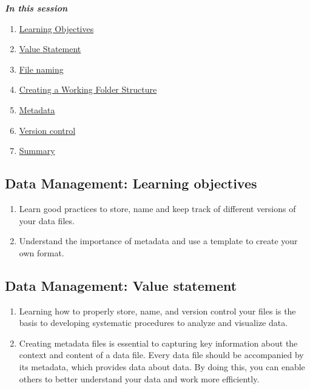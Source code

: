 \documentclass[
]{book}
\providecommand{\tightlist}{%
  \setlength{\itemsep}{0pt}\setlength{\parskip}{0pt}}
\begin{document}
\textbf{\emph{In this session}}

\begin{enumerate}
\def\labelenumi{\arabic{enumi}.}
\tightlist
\item
  \protect\hyperlink{data-management-learning-objectives}{Learning Objectives}
\item
  \protect\hyperlink{data-management-value-statement}{Value Statement}
\item
  \protect\hyperlink{file-naming}{File naming}
\item
  \protect\hyperlink{creating-a-working-folder-structure}{Creating a Working Folder Structure}
\item
  \protect\hyperlink{metadata}{Metadata}
\item
  \protect\hyperlink{version-control}{Version control}
\item
  \protect\hyperlink{data-management-summary}{Summary}
\end{enumerate}

\hypertarget{data-management-learning-objectives}{%
\subsection{Data Management: Learning objectives}\label{data-management-learning-objectives}}

\begin{enumerate}
\def\labelenumi{\arabic{enumi}.}
\item
  Learn good practices to store, name and keep track of different versions of your data files.
\item
  Understand the importance of metadata and use a template to create your own format.
\end{enumerate}

\hypertarget{data-management-value-statement}{%
\subsection{Data Management: Value statement}\label{data-management-value-statement}}

\begin{enumerate}
\def\labelenumi{\arabic{enumi}.}
\item
  Learning how to properly store, name, and version control your files is the basis to developing systematic procedures to analyze and visualize data.
\item
  Creating metadata files is essential to capturing key information about the context and content of a data file. Every data file should be accompanied by its metadata, which provides data about data. By doing this, you can enable others to better understand your data and work more efficiently.
\end{enumerate}
\end{document}
